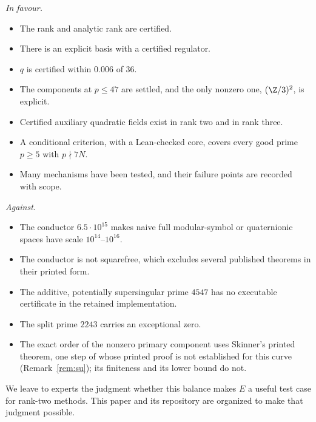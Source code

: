 \emph{In favour.}
\begin{itemize}[leftmargin=*]
\item The rank and analytic rank are certified.
\item There is an explicit basis with a certified regulator.
\item $q$ is certified within $0.006$ of $36$.
\item The components at $p\le47$ are settled, and the only nonzero one, $(\Z/3)^2$, is explicit.
\item Certified auxiliary quadratic fields exist in rank two and in rank three.
\item A conditional criterion, with a Lean-checked core, covers every good prime $p\ge5$ with $p\nmid7N$.
\item Many mechanisms have been tested, and their failure points are recorded with scope.
\end{itemize}

\emph{Against.}
\begin{itemize}[leftmargin=*]
\item The conductor $6.5\cdot10^{15}$ makes naive full modular-symbol or quaternionic spaces have scale $10^{14}$--$10^{16}$.
\item The conductor is not squarefree, which excludes several published theorems in their printed form.
\item The additive, potentially supersingular prime $4547$ has no executable certificate in the retained implementation.
\item The split prime $2243$ carries an exceptional zero.
\item The exact order of the nonzero primary component uses Skinner's printed theorem, one step of whose printed proof is not established for this curve (Remark~\ref{rem:su}); its finiteness and its lower bound do not.
\end{itemize}

We leave to experts the judgment whether this balance makes $E$ a useful test case for rank-two methods. This paper and its repository are organized to make that judgment possible.

